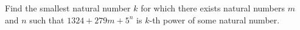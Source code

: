 Find the smallest natural number $ k$ for which there exists natural numbers $ m$ and $ n$ such that $ 1324 + 279m + 5^n$ is $ k$-th power of some natural number.